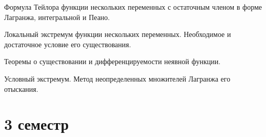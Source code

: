 \documentclass[a4paper]{article}
\begin{document}
\begin{nums}{-2}
\item Формула Тейлора функции нескольких переменных с остаточным членом в форме
Лагранжа, интегральной и Пеано.

\item Локальный экстремум функции нескольких переменных. Необходимое и достаточное
условие его существования.

\item Теоремы о существовании и дифференцируемости неявной функции.

\item Условный экстремум. Метод неопределенных множителей Лагранжа его отыскания.

\end{nums}

\section*{3 семестр}
\end{document}
